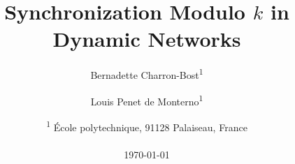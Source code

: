 \documentclass[11pt,letterpaper]{article}
\begin{document}
\title{Synchronization Modulo $k$ in Dynamic Networks}

 \author{%
 Bernadette Charron-Bost\textsuperscript{1} 
  \and Louis Penet de Monterno\textsuperscript{1}}
 \date{\textsuperscript{1} \'Ecole polytechnique, 91128 Palaiseau, France\\~\\
 \today
  }

\maketitle



\begin{abstract}

\end{abstract}




	

%




\end{document}
